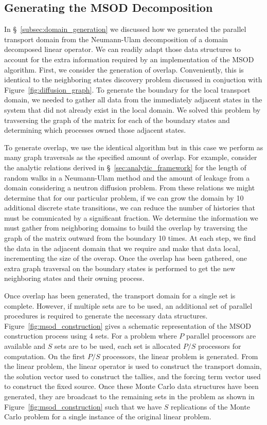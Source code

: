 \subsection{Generating the MSOD Decomposition }
\label{subsec:msod_generation}
In \S~\ref{subsec:domain_generation} we discussed how we generated the
parallel transport domain from the Neumann-Ulam decomposition of a
domain decomposed linear operator. We can readily adapt those data
structures to account for the extra information required by an
implementation of the MSOD algorithm. First, we consider the
generation of overlap. Conveniently, this is identical to the
neighboring states discovery problem discussed in conjuction with
Figure~\ref{fig:diffusion_graph}. To generate the boundary for the
local transport domain, we needed to gather all data from the
immediately adjacent states in the system that did not already exist
in the local domain. We solved this problem by travsersing the graph
of the matrix for each of the boundary states and determining which
processes owned those adjacent states. 

To generate overlap, we use the identical algorithm but in this case
we perform as many graph traversals as the specified amount of
overlap. For example, consider the analytic relations derived in
\S~\ref{sec:analytic_framework} for the length of random walks in a
Neumann-Ulam method and the amount of leakage from a domain
considering a neutron diffusion problem. From these relations we might
determine that for our particular problem, if we can grow the domain
by 10 additional discrete state transitions, we can reduce the number
of histories that must be comunicated by a significant fraction. We
determine the information we must gather from neighboring domains to
build the overlap by traversing the graph of the matrix outward from
the boundary 10 times. At each step, we find the data in the adjacent
domain that we require and make that data local, incrementing the size
of the overap. Once the overlap has been gathered, one extra graph
traversal on the boundary states is performed to get the new
neighboring states and their owning process.

Once overlap has been generated, the transport domain for a single set
is complete. However, if multiple sets are to be used, an additional
set of parallel procedures is required to generate the necessary data
structures. Figure~\ref{fig:msod_construction} gives a schematic
representation of the MSOD construction process using 4 sets. For a
problem where $P$ parallel processors are available and $S$ sets are
to be used, each set is allocated $P/S$ processors for computation. On
the first $P/S$ processors, the linear problem is generated. From the
linear problem, the linear operator is used to construct the transport
domain, the solution vector used to construct the tallies, and the
forcing term vector used to construct the fixed source. Once these
Monte Carlo data structures have been generated, they are broadcast to
the remaining sets in the problem as shown in
Figure~\ref{fig:msod_construction} such that we have $S$ replications
of the Monte Carlo problem for a single instance of the original
linear problem.

